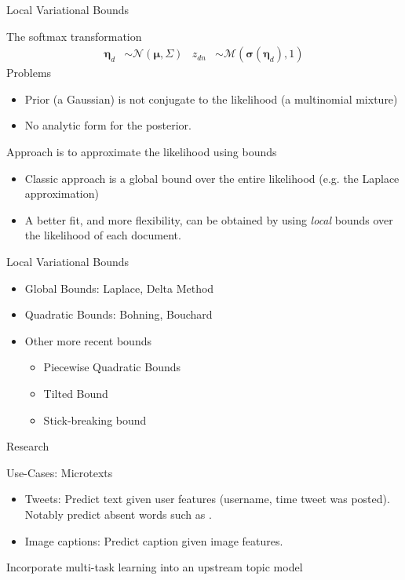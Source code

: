 \documentclass[xcolor=dvipsnames]{beamer}
\newcommand \vv[1] { \boldsymbol #1 }
\newcommand \nor[2]   { \mathcal{N} \left( {#1}, {#2} \right) }
\newcommand \muln[2]  { \mathcal{M} \left( {#1},{#2} \right) }
\begin{document}
\begin{frame}{Local Variational Bounds}

The softmax transformation
\begin{align}
    \vv{\eta}_d & \sim \nor{\vv{\mu}}{\Sigma} & z_{dn} & \sim \muln{\vv{\sigma}(\vv{\eta}_d)}{1}
\end{align}
Problems
\begin{itemize}
    \item Prior (a Gaussian) is not conjugate to the likelihood (a multinomial mixture)
    \item No analytic form for the posterior.
\end{itemize}
Approach is to approximate the likelihood using bounds
\begin{itemize}
    \item Classic approach is a global bound over the entire likelihood (e.g. the Laplace approximation)
    \item A better fit, and more flexibility, can be obtained by using \emph{local} bounds over the likelihood of each document.
\end{itemize}

\end{frame}



\begin{frame}{Local Variational Bounds}

\begin{itemize}
    \item Global Bounds: Laplace, Delta Method\cite{Wang2013a}
    \item Quadratic Bounds: Bohning\cite{Bohning1988a}, Bouchard\cite{Bouchard2007}
    \item Other more recent bounds
    \begin{itemize}
        \item Piecewise Quadratic Bounds\cite{Marlin2011}
        \item Tilted Bound\cite{MinkaKnowles}
        \item Stick-breaking bound\cite{Khan2012stick}
    \end{itemize}
\end{itemize}


\end{frame}


\begin{frame}{Research}

Use-Cases: Microtexts
\begin{itemize}
    \item Tweets: Predict text given user features (username, time tweet was posted). Notably predict absent words such as .
    \item Image captions: Predict caption given image features.
\end{itemize}

Incorporate multi-task learning into an upstream topic model

\end{frame}
\end{document}
